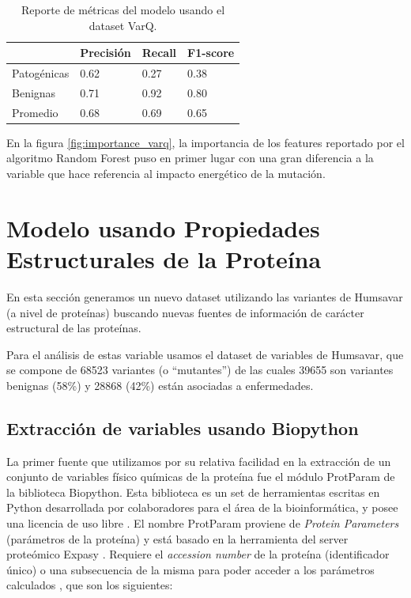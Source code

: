 \begin{table}[H]
\centering
\begin{tabular}{|l|l|l|l|}
\hline
              & Precisión & Recall & F1-score \\ \hline
Patogénicas   & 0.62      & 0.27   & 0.38     \\ \hline
Benignas      & 0.71      & 0.92   & 0.80     \\ \hline
Promedio      & 0.68      & 0.69   & 0.65     \\ \hline   
\end{tabular}
\caption{Reporte de métricas del modelo usando el dataset VarQ.}

\label{fig:metrics_varq}
\end{table}



En la figura \ref{fig:importance_varq}, la importancia de los features reportado por el algoritmo Random Forest puso en primer lugar con una gran diferencia a la variable que hace referencia al impacto energético de la mutación.  


\newpage

\section{Modelo usando Propiedades Estructurales de la Proteína}

En esta sección generamos un nuevo dataset utilizando las variantes de Humsavar (a nivel de proteínas) buscando nuevas fuentes de información de carácter estructural de las proteínas.

Para el análisis de estas variable usamos el dataset de variables de Humsavar, que se compone de 68523 variantes (o ``mutantes'') de las cuales 39655 son variantes benignas (58\%) y 28868 (42\%) están asociadas a enfermedades. 

\subsection{Extracción de variables usando Biopython}

La primer fuente que utilizamos por su relativa facilidad en la extracción de un conjunto de variables físico químicas de la proteína fue el módulo ProtParam de la biblioteca Biopython. Esta biblioteca es un set de herramientas escritas en Python desarrollada por colaboradores para el área de la bioinformática, y posee una licencia de uso libre \todo{[citar]}.
El nombre ProtParam proviene de \textit{Protein Parameters} (parámetros de la proteína) y está basado en la herramienta del server proteómico Expasy \todo{[citar]}. Requiere el \textit{accession number} de la proteína (identificador único) o una subsecuencia de la misma para poder acceder a los parámetros calculados \todo{[citar]}, que son los siguientes:

